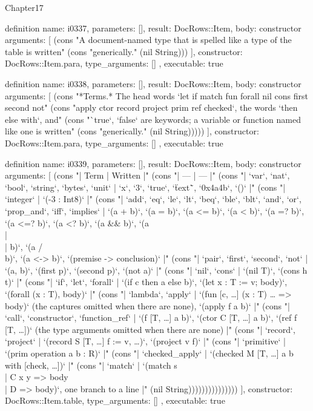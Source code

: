 \begin{lexlean}{Chapter17}
\begin{semanticmodule}
definition{
  name: i0337,
  parameters: [],
  result: DocRows::Item,
  body: constructor{
    arguments: [
      (cons "A document-named type that is spelled like a type of the table is written" (cons "generically." (nil String)))
    ],
    constructor: DocRows::Item.para,
    type_arguments: []
  },
  executable: true
}

definition{
  name: i0338,
  parameters: [],
  result: DocRows::Item,
  body: constructor{
    arguments: [
      (cons "*Terms.* The head words `let if match fun forall nil cons first second not" (cons "apply ctor record project prim ref checked`, the words `then else with`, and" (cons "`true`, `false` are keywords; a variable or function named like one is written" (cons "generically." (nil String)))))
    ],
    constructor: DocRows::Item.para,
    type_arguments: []
  },
  executable: true
}

definition{
  name: i0339,
  parameters: [],
  result: DocRows::Item,
  body: constructor{
    arguments: [
      (cons "| Term | Written |" (cons "| --- | --- |" (cons "| `var`, `nat`, `bool`, `string`, `bytes`, `unit` | `x`, `3`, `true`, `\"text\"`, `0x4a4b`, `()` |" (cons "| `integer` | `(-3 : Int8)` |" (cons "| `add`, `eq`, `le`, `lt`, `beq`, `ble`, `blt`, `and`, `or`, `prop_and`, `iff`, `implies` | `(a + b)`, `(a = b)`, `(a <= b)`, `(a < b)`, `(a =? b)`, `(a <=? b)`, `(a <? b)`, `(a && b)`, `(a \\|\\| b)`, `(a /\\ b)`, `(a <-> b)`, `(premise -> conclusion)` |" (cons "| `pair`, `first`, `second`, `not` | `(a, b)`, `(first p)`, `(second p)`, `(not a)` |" (cons "| `nil`, `cons` | `(nil T)`, `(cons h t)` |" (cons "| `if`, `let`, `forall` | `(if c then a else b)`, `(let x : T := v; body)`, `(forall (x : T), body)` |" (cons "| `lambda`, `apply` | `(fun [c, …] (x : T) … => body)` (the captures omitted when there are none), `(apply f a b)` |" (cons "| `call`, `constructor`, `function_ref` | `(f [T, …] a b)`, `(ctor C [T, …] a b)`, `(ref f [T, …])` (the type arguments omitted when there are none) |" (cons "| `record`, `project` | `(record S [T, …] {f := v, …})`, `(project v f)` |" (cons "| `primitive` | `(prim operation a b : R)` |" (cons "| `checked_apply` | `(checked M [T, …] a b with [check, …])` |" (cons "| `match` | `(match s \\| C x y => body \\| D => body)`, one branch to a line |" (nil String)))))))))))))))
    ],
    constructor: DocRows::Item.table,
    type_arguments: []
  },
  executable: true
}


\end{semanticmodule}
\end{lexlean}

